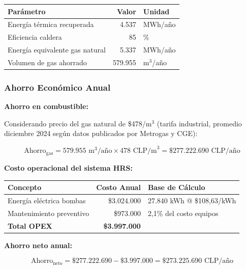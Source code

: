 \documentclass[12pt,a4paper]{article}
\begin{document}
\begin{table}[h]
\centering
\begin{tabular}{lrl}
\toprule
\textbf{Parámetro} & \textbf{Valor} & \textbf{Unidad} \\
\midrule
Energía térmica recuperada & 4.537 & MWh/año \\
Eficiencia caldera & 85 & \% \\
Energía equivalente gas natural & 5.337 & MWh/año \\
Volumen de gas ahorrado & 579.955 & m$^3$/año \\
\bottomrule
\end{tabular}
\end{table}

\subsubsection{Ahorro Económico Anual}

\textbf{Ahorro en combustible:}

Considerando precio del gas natural de \$478/m$^3$ (tarifa industrial, promedio diciembre 2024 según datos publicados por Metrogas y CGE):

\begin{equation}
\text{Ahorro}_{\text{gas}} = 579.955 \text{ m}^3\text{/año} \times 478 \text{ CLP/m}^3 = \text{\$277.222.690 CLP/año}
\end{equation}

\textbf{Costo operacional del sistema HRS:}

\begin{table}[h]
\centering
\begin{tabular}{lrl}
\toprule
\textbf{Concepto} & \textbf{Costo Anual} & \textbf{Base de Cálculo} \\
\midrule
Energía eléctrica bombas & \$3.024.000 & 27.840 kWh @ \$108,63/kWh \\
Mantenimiento preventivo & \$973.000 & 2,1\% del costo equipos \\
\midrule
\textbf{Total OPEX} & \textbf{\$3.997.000} & \\
\bottomrule
\end{tabular}
\end{table}

\textbf{Ahorro neto anual:}

\begin{equation}
\text{Ahorro}_{\text{neto}} = \text{\$277.222.690} - \text{\$3.997.000} = \text{\$273.225.690 CLP/año}
\end{equation}
\end{document}
